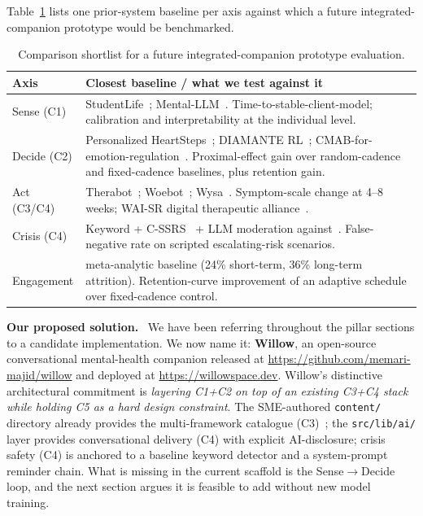 \documentclass[10pt,conference]{article}
\newcommand{\tabref}[1]{Table~\ref{#1}}
\renewcommand{\paragraph}[1]{\smallskip\par\noindent\textbf{#1}~\ignorespaces}
\begin{document}
\tabref{tab:comparison} lists one prior-system baseline per axis
against which a future integrated-companion prototype would be
benchmarked.

\begin{table}[t]
\small
\begin{tabularx}{\textwidth}{l X}
\toprule
\textbf{Axis} & \textbf{Closest baseline / what we test against it} \\
\midrule
Sense (C1) & StudentLife~\cite{Wang2014StudentLife,Wang2020COVIDStudentLife}; Mental-LLM~\cite{Xu2024MentalLLM}. Time-to-stable-client-model; calibration and interpretability at the individual level. \\
Decide (C2) & Personalized HeartSteps~\cite{Liao2020PersonalizedHeartSteps}; DIAMANTE RL~\cite{Aguilera2024DIAMANTERL}; CMAB-for-emotion-regulation~\cite{Ameko2020CMABEmotion}. Proximal-effect gain over random-cadence and fixed-cadence baselines, plus retention gain. \\
Act (C3/C4) & Therabot~\cite{Heinz2025TherabotRCT}; Woebot~\cite{Fitzpatrick2017Woebot}; Wysa~\cite{Inkster2018Wysa}. Symptom-scale change at 4--8 weeks; WAI-SR digital therapeutic alliance~\cite{Hatcher2006WAISR}. \\
Crisis (C4) & Keyword + C-SSRS~\cite{Posner2011CSSRS} + LLM moderation against~\cite{DeFreitas2024ChatbotSafety,Scholich2025TherapistVsChatbot}. False-negative rate on scripted escalating-risk scenarios. \\
Engagement & \cite{Linardon2020Attrition} meta-analytic baseline (24\% short-term, 36\% long-term attrition). Retention-curve improvement of an adaptive schedule over fixed-cadence control. \\
\bottomrule
\end{tabularx}
\caption{Comparison shortlist for a future integrated-companion prototype evaluation.}
\label{tab:comparison}
\end{table}

\paragraph{Our proposed solution.}
We have been referring throughout the pillar sections to a candidate
implementation. We now name it: \textbf{Willow}, an open-source
conversational mental-health companion released at
\url{https://github.com/memari-majid/willow} and deployed at
\url{https://willowspace.dev}. Willow's distinctive architectural
commitment is \emph{layering C1+C2 on top of an existing C3+C4 stack
while holding C5 as a hard design constraint}. The SME-authored
\texttt{content/} directory already provides the multi-framework
catalogue
(C3)~\cite{Hofmann2012CBTMeta,ATjak2015ACTMeta,Lundahl2010MIMeta}; the
\texttt{src/lib/ai/} layer provides conversational delivery (C4)
with explicit AI-disclosure; crisis safety (C4) is anchored to a
baseline keyword detector and a system-prompt reminder chain. What is
missing in the current scaffold is the Sense$\to$Decide loop, and the
next section argues it is feasible to add without new model training.
\end{document}
